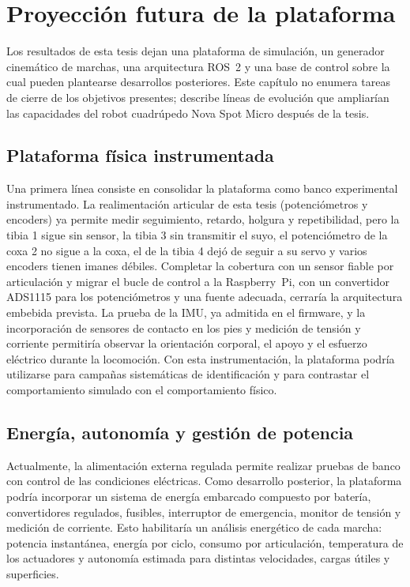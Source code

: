 \chapter{Proyección futura de la plataforma}

Los resultados de esta tesis dejan una plataforma de simulación, un generador
cinemático de marchas, una arquitectura ROS~2 y una base de control sobre la
cual pueden plantearse desarrollos posteriores. Este capítulo no enumera
tareas de cierre de los objetivos presentes; describe líneas de evolución que
ampliarían las capacidades del robot cuadrúpedo Nova Spot Micro después de la
tesis.

\section{Plataforma física instrumentada}

Una primera línea consiste en consolidar la plataforma como banco experimental
instrumentado. La realimentación articular de esta tesis (potenciómetros y
encoders) ya permite medir seguimiento, retardo, holgura y repetibilidad, pero
la tibia 1 sigue sin sensor, la tibia 3 sin transmitir el suyo, el potenciómetro de la
coxa 2 no sigue a la coxa, el de la tibia 4 dejó de seguir a su servo y varios encoders tienen imanes débiles.
Completar la cobertura con un sensor fiable por articulación y migrar el bucle de
control a la Raspberry~Pi, con un convertidor ADS1115 para los potenciómetros y
una fuente adecuada, cerraría la arquitectura embebida prevista. La
prueba de la IMU, ya admitida en el firmware, y la incorporación de sensores de contacto en los pies y medición
de tensión y corriente permitiría observar la orientación corporal, el apoyo y
el esfuerzo eléctrico durante la locomoción. Con esta instrumentación, la
plataforma podría utilizarse para campañas sistemáticas de identificación y
para contrastar el comportamiento simulado con el comportamiento físico.

\section{Energía, autonomía y gestión de potencia}

Actualmente, la alimentación externa regulada permite realizar pruebas de banco
con control de las condiciones eléctricas. Como desarrollo posterior, la
plataforma podría incorporar un sistema de energía embarcado compuesto por
batería, convertidores regulados, fusibles, interruptor de emergencia, monitor
de tensión y medición de corriente. Esto habilitaría un análisis energético de
cada marcha: potencia instantánea, energía por ciclo, consumo por articulación,
temperatura de los actuadores y autonomía estimada para distintas velocidades,
cargas útiles y superficies.

